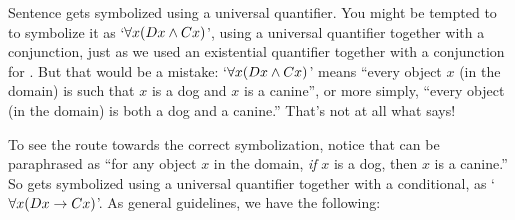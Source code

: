 Sentence  gets symbolized using a universal quantifier.  You might be tempted to to symbolize it as `$\forall x(Dx \wedge Cx)$', using a universal quantifier together with a conjunction, just as we used an existential quantifier together with a conjunction for .  But that would be a mistake: `$\forall x(Dx \wedge Cx)$' means ``every object $x$ (in the domain) is such that $x$ is a dog and $x$ is a canine'', or more simply, ``every object (in the domain) is both a dog and a canine.''  That's not at all what  says!

To see the route towards the correct symbolization, notice that  can be paraphrased as ``for any object $x$ in the domain, \emph{if} $x$ is a dog, then $x$ is a canine.''   So  gets symbolized using a universal quantifier together with a conditional, as `$\forall x(Dx \rightarrow Cx)$'.  As general guidelines, we have the following:




